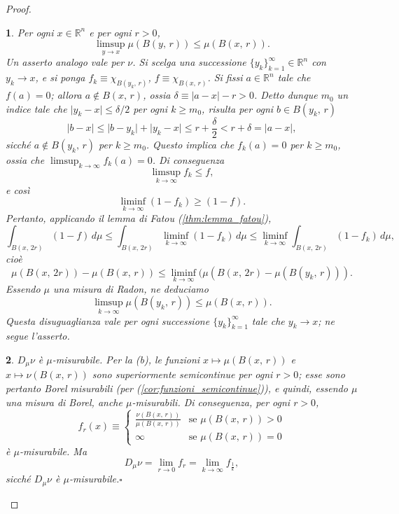 \documentclass[a4paper,10pt,openright,oneside]{book}
\theoremstyle{theoremstyle}
\theoremstyle{theoremstylewoheader}
\theoremstyle{theoremstyle}
\theoremstyle{proofsecstyle}
\newtheorem{proofsec}{}
\theoremstyle{nonumberplain}
\newtheorem{proof}{Dim.}
\newcommand{\RR}{\ensuremath{\mathbb{R}}}
\newcommand{\Der}[2]{\ensuremath{D_#2 #1}}
\newcommand{\abs}[1]{\ensuremath{\lvert #1 \rvert}}
\renewcommand{\qedsymbol}{\ensuremath{\square}}
\newcommand{\qed}{\unskip\nobreak\hfill\nobreak\hspace{.5em}\qedsymbol}
\begin{document}
\begin{proof}
\begin{proofsec}
\emph{Per ogni $x \in \RR^n$ e per ogni $r > 0$,}
\[
\limsup_{y \to x} \mu(B(y,\, r)) \le \mu(B(x,\, r)).
\]
\emph{Un asserto analogo vale per $\nu$.}\hspace{.5em} Si scelga una successione $\{y_k\}_{k=1}^\infty \in \RR^n$ con $y_k \to x$, e si ponga $f_k \equiv \chi_{B(y_k,\, r)}$, $f \equiv \chi_{B(x,\, r)}$. Si fissi $a \in \RR^n$ tale che $f(a) = 0$; allora $a \notin B(x,\, r)$, ossia $\delta \equiv \abs{a - x} - r > 0$. Detto dunque $m_0$ un indice tale che $\abs{y_k - x} \le \delta/2$ per ogni $k \ge m_0$, risulta per ogni $b \in B(y_k,\, r)$
\[
\abs{b - x} \le \abs{b - y_k} + \abs{y_k - x} \le r + \frac{\delta}{2} < r + \delta = \abs{a - x},
\]
sicché $a \notin B(y_k,\, r)$ per $k \ge m_0$. Questo implica che $f_k(a) = 0$ per $k \ge m_0$, ossia che $\limsup_{k \to \infty} f_k(a) = 0$. Di conseguenza
\[
\limsup_{k \to \infty} f_k \le f,
\]
e così
\[
\liminf_{k \to \infty} (1 - f_k) \ge (1 - f).
\]
Pertanto, applicando il lemma di Fatou (\ref{thm:lemma_fatou}),
\[
\int_{B(x,\, 2r)} (1-f)\, d\mu \le \int_{B(x,\, 2r)} \liminf_{k \to \infty} (1-f_k)\, d\mu \le \liminf_{k \to \infty} \int_{B(x,\, 2r)} (1-f_k)\, d\mu,
\]
cioè
\[
\mu(B(x,\, 2r)) - \mu(B(x,\, r)) \le \liminf_{k \to \infty} (\mu(B(x,\, 2r) - \mu(B(y_k,\, r))).
\]
Essendo $\mu$ una misura di Radon, ne deduciamo 
\[
\limsup_{k \to \infty} \mu(B(y_k,\, r)) \le \mu(B(x,\, r)).
\]
Questa disuguaglianza vale per ogni successione $\{y_k\}_{k=1}^\infty$ tale che $y_k \to x$; ne segue l'asserto. 
\end{proofsec}

\begin{proofsec}
\emph{$\Der{\nu}{\mu}$ è $\mu$-misurabile.}\hspace{.5em} Per la (b), le funzioni $x \mapsto \mu(B(x,\, r))$ e $x \mapsto \nu(B(x,\, r))$ sono superiormente semicontinue per ogni $r > 0$; esse sono pertanto Borel misurabili (per (\ref{cor:funzioni_semicontinue})), e quindi, essendo $\mu$ una misura di Borel, anche $\mu$-misurabili. Di conseguenza, per ogni $r > 0$,
\[
f_r(x) \equiv \begin{cases}
\displaystyle\frac{\nu(B(x,\, r))}{\mu(B(x,\, r))} & \text{se $\mu(B(x,\, r)) > 0$}\\
\infty & \text{se $\mu(B(x,\, r)) = 0$}
\end{cases}
\]
è $\mu$-misurabile. Ma
\[
\Der{\nu}{\mu} = \lim_{r \to 0} f_r = \lim_{k \to \infty} f_{\frac{1}{k}},
\]
sicché $\Der{\nu}{\mu}$ è $\mu$-misurabile.\qed
\end{proofsec}
\end{proof}
\end{document}
